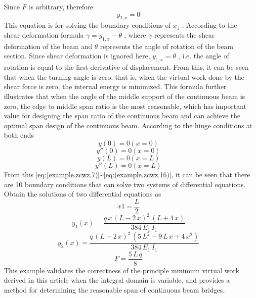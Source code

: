 Since $ F $ is arbitrary, therefore
\begin{equation}\label{eq:(example.zcwz.13)}
y_{1,x}=0 
\end{equation}
This equation is for solving the boundary conditions of $ x_1 $ . According to the shear deformation formula $ \gamma=y_ {1,x}- \theta $ , where $ \gamma $ represents the shear deformation of the beam and $ \theta $ represents the angle of rotation of the beam section. Since shear deformation is ignored here, $ y_ {1, x}=\theta $ , i.e. the angle of rotation is equal to the first derivative of displacement. From this, it can be seen that when the turning angle is zero, that is, when the virtual work done by the shear force is zero, the internal energy is minimized. This formula further illustrates that when the angle of the middle support of the continuous beam is zero, the edge to middle span ratio is the most reasonable, which has important value for designing the span ratio of the continuous beam and can achieve the optimal span design of the continuous beam.
According to the hinge conditions at both ends
\begin{equation}\label{eq:(example.zcwz.13)}
y(0)=0 (x=0)
\end{equation}
\begin{equation}\label{eq:(example.zcwz.14)}
y''(0)=0 (x=0)
\end{equation}
\begin{equation}\label{eq:(example.zcwz.15)}
y(L)=0 (x=L)
\end{equation}
\begin{equation}\label{eq:(example.zcwz.16)}
y''(L)=0 (x=L)
\end{equation}
From this \ref{eq:(example.zcwz.7)}\~{}\ref{eq:(example.zcwz.16)}, it can be seen that there are 10 boundary conditions that can solve two systems of differential equations.
Obtain the solutions of two differential equations as
\begin{equation}\label{eq:(example.zcwz.19)}
x1=\frac{L}{2}
\end{equation}
\begin{equation}\label{eq:(example.zcwz.17)}
y_1(x)=\frac{q\,x\,{{\left(L-2\,x\right)}}^2 \,{\left(L+4\,x\right)}}{384\,E_1 \,I_1 }
\end{equation}
\begin{equation}\label{eq:(example.zcwz.18)}
y_2(x)=\frac{q\,{{\left(L-2\,x\right)}}^2 \,{\left(5\,L^2 -9\,L\,x+4\,x^2 \right)}}{384\,E_1 \,I_1 }
\end{equation}
\begin{equation}\label{eq:(example.zcwz.20)}
F=\frac{5\,L\,q}{8}
\end{equation}
This example validates the correctness of the principle minimum virtual work derived in this article when the integral domain is variable, and provides a method for determining the reasonable span of continuous beam bridges.

